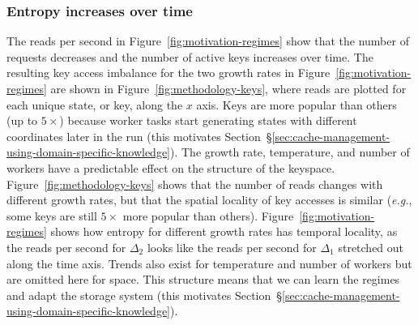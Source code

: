 \subsubsection*{Entropy increases over time} The reads per second in
Figure~\ref{fig:motivation-regimes} show that the number of requests decreases
and the number of active keys increases over time. The resulting key access
imbalance for the two growth rates in Figure~\ref{fig:motivation-regimes} are
shown in Figure~\ref{fig:methodology-keys}, where reads are plotted for each
unique state, or key, along the \(x\) axis. Keys are more popular than others
(up to \(5\times\)) because worker tasks start generating states with different
coordinates later in the run (this motivates
Section~\S\ref{sec:cache-management-using-domain-specific-knowledge}).  The
growth rate, temperature, and number of workers have a predictable effect on
the structure of the keyspace.  Figure~\ref{fig:methodology-keys} shows that
the number of reads changes with different growth rates, but that the spatial
locality of key accesses is similar ({\it e.g.}, some keys are still
\(5\times\) more popular than others).  Figure~\ref{fig:motivation-regimes}
shows how entropy for different growth rates has temporal locality, as the
reads per second for \(\Delta_2\) looks like the reads per second for
\(\Delta_1\) stretched out along the time axis.  Trends also exist for
temperature and number of workers but are omitted here for space. This
structure means that we can learn the regimes and adapt the storage system
(this motivates Section~\S\ref{sec:cache-management-using-domain-specific-knowledge}).
